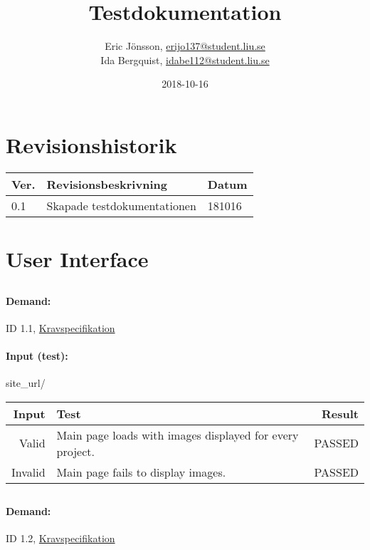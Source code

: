 \documentclass{TDP003mall}
\author{Eric Jönsson, \url{erijo137@student.liu.se}\\
  Ida Bergquist, \url{idabe112@student.liu.se}}
\title{Testdokumentation}
\date{2018-10-16}
\begin{document}
\projectpage
\tableofcontents
\newpage
\section{Revisionshistorik}
\begin{table}[!h]
\begin{tabularx}{\linewidth}{|l|X|l|}
\hline
\textbf{Ver.} & \textbf{Revisionsbeskrivning} & \textbf{Datum} \\\hline
0.1 & Skapade testdokumentationen & 181016 \\\hline
\end{tabularx}
\end{table}

\section{User Interface}
\subsection{}
\paragraph{Demand: } ID 1.1, \href{https://www.ida.liu.se/~TDP003/current/projekt/dokument/systemspecifikation.pdf}{Kravspecifikation}
\paragraph{Input (test):}
site\_url/

\begin{table}[!h]
\begin{tabularx}{\linewidth}{|r|X|r|}\hline
\textbf{Input} & \textbf{Test} & \textbf{ Result} \\\hline
Valid & Main page loads with images displayed for every project. & PASSED \\\hline
Invalid & Main page fails to display images. & PASSED \\\hline
\end{tabularx}
\end{table}

\subsection{}
\paragraph{Demand: } ID 1.2, \href{https://www.ida.liu.se/~TDP003/current/projekt/dokument/systemspecifikation.pdf}{Kravspecifikation}
\end{document}

